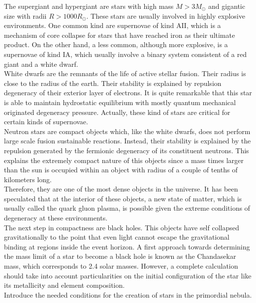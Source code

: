 \documentclass[openany]{book}
\begin{document}
The supergiant and hypergiant are stars with high mass $M > 3M_{\odot}$ and gigantic size with radii $R > 1000R_{\odot}$. These stars are usually involved in highly explosive environments. One common kind are supernovae of kind AII, which is a mechanism of core collapse for stars that have reached iron as their ultimate product. On the other hand, a less common, although more explosive, is a supernovae of kind IA, which usually involve a binary system consistent of a red giant and a white dwarf. \\

White dwarfs are the remnants of the life of active stellar fusion. Their radius is close to the radius of the earth. Their stability is explained by repulsion degeneracy of their exterior layer of electrons. It is quite remarkable that this star is able to maintain hydrostatic equilibrium with mostly quantum mechanical originated degeneracy pressure.  Actually, these kind of stars are critical for certain kinds of supernovae. \\ 

Neutron stars are compact objects which, like the white dwarfs, does not perform large scale fusion sustainable reactions. Instead, their stability is explained by the repulsion generated by the fermionic degeneracy of its constituent neutrons. This explains the extremely compact nature of this objects since a mass times larger than the sun is occupied within an object with radius of a couple of tenths of kilometers long. \\ 

Therefore, they are one of the most dense objects in the universe.  It has been speculated that  at the interior of these objects, a new state of matter, which is usually called the quark gluon plasma, is possible given the extreme conditions of degeneracy at these environments.\\ 

The next step in compactness are black holes. This objects have self collapsed gravitationally to the point that even light cannot escape the gravitational binding at regions inside the event horizon. A first approach towards determining the mass limit of a star to become a black hole is known as the Chandasekar mass, which corresponds to 2.4 solar masses. However, a complete calculation should take into account particularities on the initial configuration of the star like its metallicity and element composition.  \\

Introduce the needed conditions for the creation of stars in the primordial nebula.\\
\end{document}
